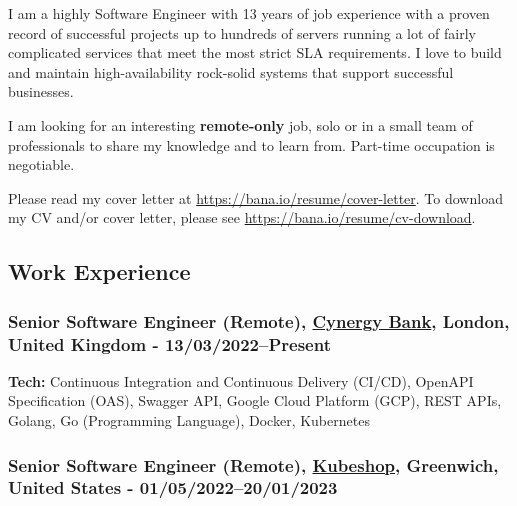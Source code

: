 \documentclass[
  a4paper,
  8pt,
]{article}
\begin{document}
\begin{multicols}{2}

I am a highly Software Engineer with 13 years of job experience with a
proven record of successful projects up to hundreds of servers running a
lot of fairly complicated services that meet the most strict SLA
requirements. I love to build and maintain high-availability rock-solid
systems that support successful businesses.

I am looking for an interesting \textbf{remote-only} job, solo or in a
small team of professionals to share my knowledge and to learn from.
Part-time occupation is negotiable.

Please read my cover letter at
\url{https://bana.io/resume/cover-letter}. To download my CV and/or
cover letter, please see \url{https://bana.io/resume/cv-download}.

\hypertarget{work-experience}{%
\subsection{Work Experience}\label{work-experience}}

\hypertarget{senior-software-engineer-remote-cynergy-bank-london-united-kingdom---13032022present}{%
\subsubsection{\texorpdfstring{Senior Software Engineer (Remote),
\href{https://cynergybank.co.uk}{Cynergy Bank}, London, United Kingdom -
13/03/2022--Present}{Senior Software Engineer (Remote), Cynergy Bank, London, United Kingdom - 13/03/2022--Present}}\label{senior-software-engineer-remote-cynergy-bank-london-united-kingdom---13032022present}}

\textbf{Tech:} Continuous Integration and Continuous Delivery (CI/CD),
OpenAPI Specification (OAS), Swagger API, Google Cloud Platform (GCP),
REST APIs, Golang, Go (Programming Language), Docker, Kubernetes

\hypertarget{senior-software-engineer-remote-kubeshop-greenwich-united-states---0105202220012023}{%
\subsubsection{\texorpdfstring{Senior Software Engineer (Remote),
\href{https://kubeshop.io/}{Kubeshop}, Greenwich, United States -
01/05/2022--20/01/2023}{Senior Software Engineer (Remote), Kubeshop, Greenwich, United States - 01/05/2022--20/01/2023}}\label{senior-software-engineer-remote-kubeshop-greenwich-united-states---0105202220012023}}


\end{multicols}
\end{document}
